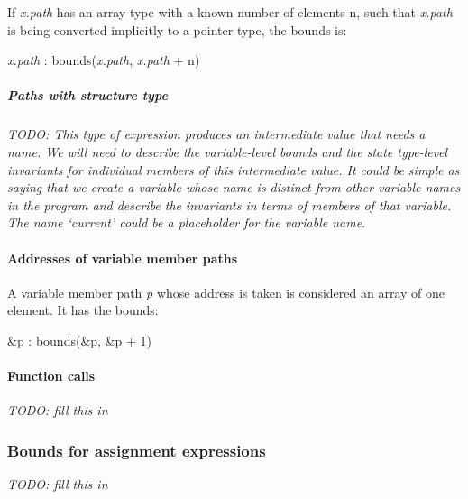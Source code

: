 \documentclass[]{article}
\let\oldparagraph\paragraph
\renewcommand{\paragraph}[1]{\oldparagraph{#1}\mbox{}}
\let\oldsubparagraph\subparagraph
\renewcommand{\subparagraph}[1]{\oldsubparagraph{#1}\mbox{}}
\begin{document}
If \emph{x.path} has an array type with a known number of elements n,
such that \emph{x.path} is being converted implicitly to a pointer type,
the bounds is:

\emph{x.path} : bounds(\emph{x.path}, \emph{x.path} + n)

\subparagraph{Paths with structure
type}\label{paths-with-structure-type}

\emph{TODO: This type of expression produces an intermediate value that
needs a name. We will need to describe the variable-level bounds and the
state type-level invariants for individual members of this intermediate
value. It could be simple as saying that we create a variable whose name
is distinct from other variable names in the program and describe the
invariants in terms of members of that variable. The name `current'
could be a placeholder for the variable name.}

\paragraph{Addresses of variable member
paths}\label{addresses-of-variable-member-paths}

A variable member path \emph{p} whose address is taken is considered an
array of one element. It has the bounds:

\&p : bounds(\&p, \&p + 1)

\paragraph{Function calls}\label{function-calls-1}

\emph{TODO: fill this in}

\subsubsection{\texorpdfstring{\protect\hypertarget{ux5fRef418872275}{}{\protect\hypertarget{ux5fToc420589206}{}{\protect\hypertarget{ux5fToc422906997}{}{\protect\hypertarget{ux5fToc424307713}{}{\protect\hypertarget{ux5fToc426641103}{}{\protect\hypertarget{ux5fToc435434985}{}{\protect\hypertarget{ux5fToc437460818}{}{\protect\hypertarget{ux5fToc440445499}{}{\protect\hypertarget{ux5fToc440449281}{}{\protect\hypertarget{ux5fToc440551931}{}{}}}}}}}}}}Bounds
for assignment
expressions}{Bounds for assignment expressions}}\label{bounds-for-assignment-expressions}

\emph{TODO: fill this in}
\end{document}
